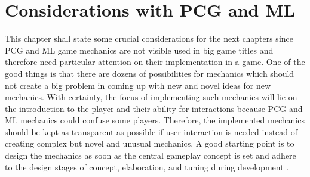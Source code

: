 \documentclass[MGS,Master,english]{twbook}%
\begin{document}
\section{Considerations with \acl{PCG} and \acl{ML}} \label{mechanicsConsiderationsPCGandML}
This chapter shall state some crucial considerations for the next chapters since \ac{PCG} and \ac{ML} game mechanics are not visible used in big game titles and therefore need particular attention on their implementation in a game. One of the good things is that there are dozens of possibilities for mechanics which should not create a big problem in coming up with new and novel ideas for new mechanics. With certainty, the focus of implementing such mechanics will lie on the introduction to the player and their ability for interactions because PCG and ML mechanics could confuse some players. Therefore, the implemented mechanics should be kept as transparent as possible if user interaction is needed instead of creating complex but novel and unusual mechanics. A good starting point is to design the mechanics as soon as the central gameplay concept is set and adhere to the design stages of concept, elaboration, and tuning during development \cite{gameDesign::gameMechanicsAdvancedGameDesign}.
\end{document}

